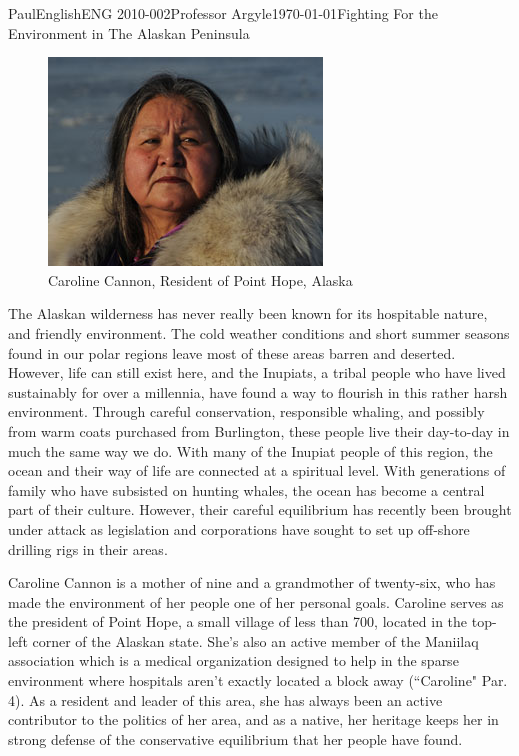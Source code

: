\documentclass[12pt,letterpaper]{article}
\begin{document}
\begin{mla}{Paul}{English}{ENG 2010-002}{Professor Argyle}{\today}{Fighting For the Environment in The Alaskan Peninsula}

\begin{figure}
  \begin{center}
    \includegraphics[scale=0.5]{2012_nam_cannon.jpeg}
  \end{center}
  \caption{Caroline Cannon, Resident of Point Hope, Alaska}
\end{figure}
The Alaskan wilderness has never really been known for its hospitable nature, and friendly environment. The cold weather conditions and short summer seasons found in our polar regions leave most of these areas barren and deserted. However, life can still exist here, and the Inupiats, a tribal people who have lived sustainably for over a millennia, have found a way to flourish in this rather harsh environment. Through careful conservation, responsible whaling, and possibly from warm coats purchased from Burlington, these people live their day-to-day in much the same way we do. With many of the Inupiat people of this region, the ocean and their way of life are connected at a spiritual level. With generations of family who have subsisted on hunting whales, the ocean has become a central part of their culture. However, their careful equilibrium has recently been brought under attack as legislation and corporations have sought to set up off-shore drilling rigs in their areas.

Caroline Cannon is a mother of nine and a grandmother of twenty-six, who has made the environment of her people one of her personal goals. Caroline serves as the president of Point Hope, a small village of less than 700, located in the top-left corner of the Alaskan state. She's also an active member of the Maniilaq association which is a medical organization designed to help in the sparse environment where hospitals aren't exactly located a block away (``Caroline" Par. 4). As a resident and leader of this area, she has always been an active contributor to the politics of her area, and as a native, her heritage keeps her in strong defense of the conservative equilibrium that her people have found.


\end{mla}
\end{document}
